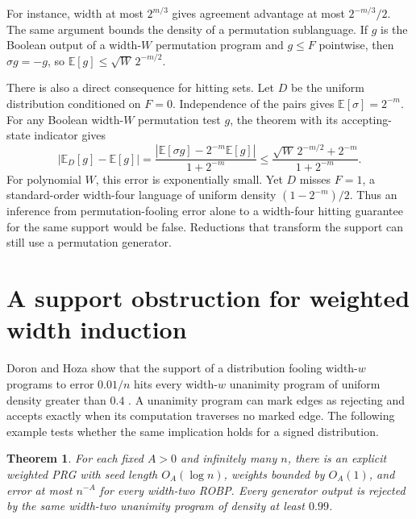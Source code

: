 \documentclass[11pt]{article}
\newtheorem{theorem}{Theorem}
\begin{document}
For instance, width at most $2^{m/3}$ gives agreement advantage at
most $2^{-m/3}/2$. The same argument bounds the density of a permutation
sublanguage. If $g$ is the Boolean output of a width-$W$ permutation
program and $g\le F$ pointwise, then $\sigma g=-g$, so
$\mathbb E[g]\le\sqrt W\,2^{-m/2}$.

There is also a direct consequence for hitting sets. Let $D$ be the
uniform distribution conditioned on $F=0$. Independence of the pairs
gives $\mathbb E[\sigma]=2^{-m}$. For any Boolean width-$W$
permutation test $g$, the theorem with its accepting-state indicator
gives
\[
 \left|\mathbb E_D[g]-\mathbb E[g]\right|
 =\frac{\left|\mathbb E[\sigma g]-2^{-m}\mathbb E[g]\right|}
        {1+2^{-m}}
 \le \frac{\sqrt{W}\,2^{-m/2}+2^{-m}}{1+2^{-m}}.
\]
For polynomial $W$, this error is exponentially small. Yet
$D$ misses $F=1$, a standard-order width-four language of uniform
density $(1-2^{-m})/2$. Thus an inference from permutation-fooling
error alone to a width-four hitting guarantee for the same support
would be false. Reductions that transform the support can still
use a permutation generator.

\section{A support obstruction for weighted width induction}

Doron and Hoza show that the support of a distribution fooling width-$w$
programs to error $0.01/n$ hits every width-$w$ unanimity program of
uniform density greater than $0.4$
\cite[Corollary~4.2]{DH}.
A unanimity program can mark edges as rejecting and accepts exactly when
its computation traverses no marked edge. The following example tests
whether the same implication holds for a signed distribution.

\begin{theorem}
For each fixed $A>0$ and infinitely many $n$, there is an explicit weighted
PRG with seed length $O_A(\log n)$, weights bounded by $O_A(1)$, and error
at most $n^{-A}$ for every width-two ROBP. Every generator output is
rejected by the same width-two unanimity program of density at least $0.99$.
\end{theorem}
\end{document}
